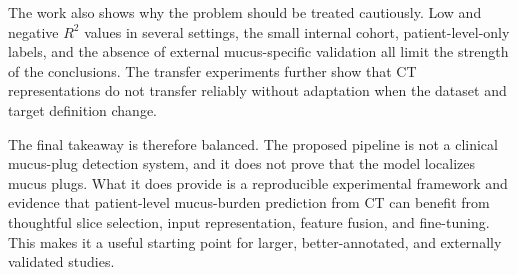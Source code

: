 The work also shows why the problem should be treated cautiously. Low and negative \(R^2\) values in several settings, the small internal cohort, patient-level-only labels, and the absence of external mucus-specific validation all limit the strength of the conclusions. The transfer experiments further show that CT representations do not transfer reliably without adaptation when the dataset and target definition change.

The final takeaway is therefore balanced. The proposed pipeline is not a clinical mucus-plug detection system, and it does not prove that the model localizes mucus plugs. What it does provide is a reproducible experimental framework and evidence that patient-level mucus-burden prediction from CT can benefit from thoughtful slice selection, input representation, feature fusion, and fine-tuning. This makes it a useful starting point for larger, better-annotated, and externally validated studies.

